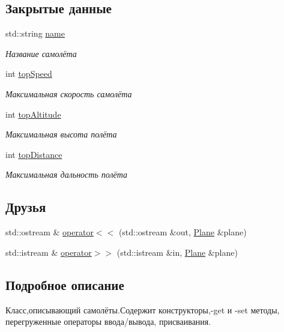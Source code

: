 \subsection*{Закрытые данные}
\begin{DoxyCompactItemize}
\item 
std\+::string \hyperlink{class_plane_a7db2211acd4f4b6506c3374889e57b7c}{name}
\begin{DoxyCompactList}\small\item\em Название самолёта \end{DoxyCompactList}\item 
int \hyperlink{class_plane_a92c9fa6e33294c3fcbfb5819c9ece8fc}{top\+Speed}
\begin{DoxyCompactList}\small\item\em Максимальная скорость самолёта \end{DoxyCompactList}\item 
int \hyperlink{class_plane_a3a1d46e422f1118ec2cd5b6c94849e73}{top\+Altitude}
\begin{DoxyCompactList}\small\item\em Максимальная высота полёта \end{DoxyCompactList}\item 
int \hyperlink{class_plane_a58a0908a45645450334d05f5fb2fa80f}{top\+Distance}
\begin{DoxyCompactList}\small\item\em Максимальная дальность полёта \end{DoxyCompactList}\end{DoxyCompactItemize}
\subsection*{Друзья}
\begin{DoxyCompactItemize}
\item 
std\+::ostream \& \hyperlink{class_plane_aef4e6b9c148b03d0f50ce12fe7be97a1}{operator$<$$<$} (std\+::ostream \&out, \hyperlink{class_plane}{Plane} \&plane)
\item 
std\+::istream \& \hyperlink{class_plane_a206468413058633f7161c1228b18af46}{operator$>$$>$} (std\+::istream \&in, \hyperlink{class_plane}{Plane} \&plane)
\end{DoxyCompactItemize}


\subsection{Подробное описание}
Класс,описывающий самолёты.\+Содержит конструкторы,-\/get и -\/set методы, перегруженные операторы ввода/вывода, присваивания. 

